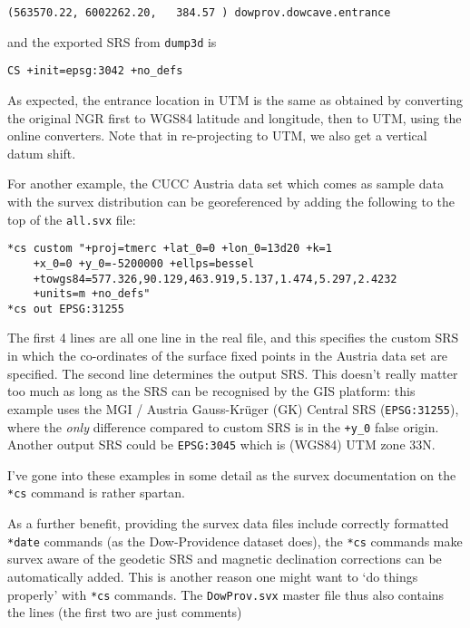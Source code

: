 \documentclass[]{article}
\begin{document}
\begin{verbatim}
(563570.22, 6002262.20,   384.57 ) dowprov.dowcave.entrance
\end{verbatim}

and the exported SRS from \verb}dump3d} is

\begin{verbatim}
CS +init=epsg:3042 +no_defs
\end{verbatim}

As expected, the entrance location in UTM is the same as obtained by
converting the original NGR first to WGS84 latitude and longitude, then
to UTM, using the online converters. Note that in re-projecting to UTM,
we also get a vertical datum shift.

For another example, the CUCC Austria data set which comes as sample
data with the survex distribution can be georeferenced by adding the
following to the top of the \verb}all.svx} file:

\begin{verbatim}
*cs custom "+proj=tmerc +lat_0=0 +lon_0=13d20 +k=1 
    +x_0=0 +y_0=-5200000 +ellps=bessel 
    +towgs84=577.326,90.129,463.919,5.137,1.474,5.297,2.4232 
    +units=m +no_defs"
*cs out EPSG:31255
\end{verbatim}

The first 4 lines are all one line in the real file, and this 
specifies the custom SRS in which the co-ordinates of the
surface fixed points in the Austria data set are specified. The second
line determines the output SRS. This doesn't really matter too much as
long as the SRS can be recognised by the GIS platform: this example uses
the MGI / Austria Gauss-Kr\"uger (GK) Central SRS (\verb+EPSG:31255+), where the
\emph{only} difference compared to custom SRS is in the \verb:+y_0: false
origin. Another output SRS could be \verb}EPSG:3045} which
is (WGS84) UTM zone 33N.

I've gone into these examples in some detail as the survex documentation
on the \verb}*cs} command is rather spartan.

As a further benefit, providing the survex data files include correctly
formatted \verb}*date} commands (as the Dow-Providence dataset does),
the \verb}*cs} commands make survex aware of the geodetic SRS and
magnetic declination corrections can be automatically added. This is
another reason one might want to `do things properly' with \verb}*cs}
commands. The \verb}DowProv.svx} master file thus also contains the
lines (the first two are just comments)
\end{document}
